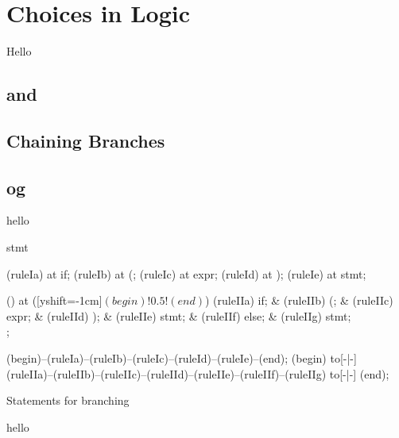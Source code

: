 \section{Choices in Logic}
\label{sec:flow:branch}

Hello

\subsection{ and }
\subsection{}
\subsection{Chaining Branches}
\subsection{ og }

\csharpsubsection{\csharp}
hello

\begin{syntaxfloat}
  \begin{syntax}{stmt}
    
    \node[terminal]    (ruleIa)  at  {if};
    \node[terminal]    (ruleIb)  at  {(};
    \node[nonterminal] (ruleIc)  at  {expr};
    \node[terminal]    (ruleId)  at  {)};
    \node[nonterminal] (ruleIe)  at  {stmt};
    
    \node[sequence] () at ([yshift=-1cm]$(begin)!0.5!(end)$) {
      \node[terminal]    (ruleIIa) {if};
      &
      \node[terminal]    (ruleIIb) {(};
      &
      \node[nonterminal] (ruleIIc) {expr};
      &
      \node[terminal]    (ruleIId) {)};
      &
      \node[nonterminal] (ruleIIe) {stmt};
      &
      \node[terminal]    (ruleIIf) {else};
      &
      \node[nonterminal] (ruleIIg) {stmt};
      \\
    };
    
    \draw[path] (begin)--(ruleIa)--(ruleIb)--(ruleIc)--(ruleId)--(ruleIe)--(end);
    \draw[path] (begin) to[-|-] (ruleIIa)--(ruleIIb)--(ruleIIc)--(ruleIId)--(ruleIIe)--(ruleIIf)--(ruleIIg) to[-|-] (end);
  \end{syntax}
  \caption{Statements for branching}
\end{syntaxfloat}

hello
